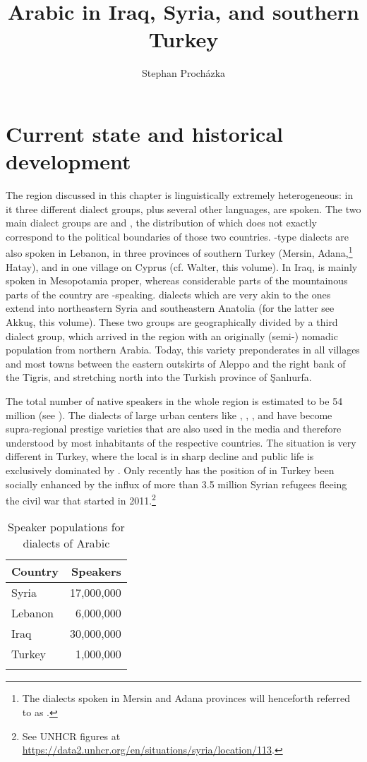 \documentclass[output=paper]{langsci/langscibook}
\author{Stephan Procházka\affiliation{University of Vienna}}
\title{Arabic in Iraq, Syria, and southern Turkey}
\begin{document}
\section{Current state and historical development}  \label{state} 

The region discussed in this chapter is linguistically extremely heterogeneous: in it three different  dialect groups, plus several other languages, are spoken. The two main  dialect groups are  and , the distribution of which does not exactly correspond to the political boundaries of those two countries. -type dialects are also spoken in Lebanon, in three provinces of southern Turkey (Mersin, Adana,\footnote{The dialects spoken in Mersin and Adana provinces will henceforth referred to as  .} Hatay), and in one village on {Cyprus} (cf. Walter, this volume). In Iraq,  is mainly spoken in Mesopotamia proper, whereas considerable parts of the mountainous parts of the country are -speaking.  dialects which are very akin to the  ones extend into northeastern Syria and southeastern {Anatolia} (for the latter see Akkuş, this volume). These two groups are geographically divided by a third dialect group, which arrived in the region with an originally (semi-) nomadic population from northern Arabia. Today, this variety preponderates in all villages and most towns between the eastern outskirts of Aleppo and the right bank of the Tigris, and stretching north into the Turkish province of Şanlıurfa. 

The total number of native  speakers in the whole region is estimated to be 54 million (see ). The dialects of large urban centers like , , , and  have become supra-regional {prestige} varieties that are also used in the media and therefore understood by most inhabitants of the respective countries. The situation is very different in Turkey, where the local  is in sharp decline and public life is exclusively dominated by . Only recently has the position of  in Turkey been socially enhanced by the influx of more than 3.5 million Syrian refugees fleeing the civil war that started in 2011.\footnote{See UNHCR figures at \url{https://data2.unhcr.org/en/situations/syria/location/113}.}

\begin{table}
\begin{tabularx}{.50\textwidth}{Xr}
\lsptoprule
Country & Speakers\\
\midrule
{Syria} &  17,000,000\\
{Lebanon} & 6,000,000\\
{Iraq} &  30,000,000\\
Turkey &  1,000,000\\
\lspbottomrule
\end{tabularx} 
\caption{Speaker populations for dialects of Arabic}
\label{tab:prochazka:1}
\end{table}
\end{document}
